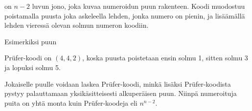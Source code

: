 
 on $n-2$ luvun jono,
joka kuvaa numeroidun puun rakenteen.
Koodi muodostuu poistamalla puusta
joka askeleella lehden, jonka numero on pienin,
ja lisäämällä lehden vieressä olevan solmun
numeron koodiin.

Esimerkiksi puun
\begin{center}
\end{center}
Prüfer-koodi on $(4,4,2)$,
koska puusta poistetaan ensin solmu 1,
sitten solmu 3 ja lopuksi solmu 5.

Jokaiselle puulle voidaan laskea
Prüfer-koodi, minkä lisäksi
Prüfer-koodista pystyy palauttamaan
yksikäsitteisesti alkuperäisen puun.
Niinpä numeroituja puita on yhtä monta
kuin Prüfer-koodeja eli $n^{n-2}$.


